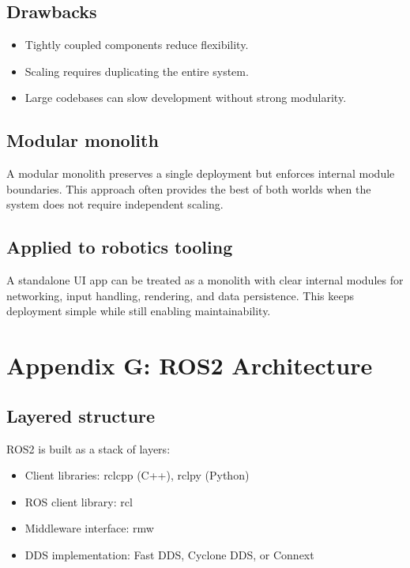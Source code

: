 \documentclass[letterpaper,10pt,english]{sphinxmanual}
\begin{document}
\section{Drawbacks}
\label{\detokenize{appendix_f_monolithic_architecture:drawbacks}}\begin{itemize}
\item {} 
\sphinxAtStartPar
Tightly coupled components reduce flexibility.

\item {} 
\sphinxAtStartPar
Scaling requires duplicating the entire system.

\item {} 
\sphinxAtStartPar
Large codebases can slow development without strong modularity.

\end{itemize}


\section{Modular monolith}
\label{\detokenize{appendix_f_monolithic_architecture:modular-monolith}}
\sphinxAtStartPar
A modular monolith preserves a single deployment but enforces internal module
boundaries. This approach often provides the best of both worlds when the
system does not require independent scaling.


\section{Applied to robotics tooling}
\label{\detokenize{appendix_f_monolithic_architecture:applied-to-robotics-tooling}}
\sphinxAtStartPar
A standalone UI app can be treated as a monolith with clear internal modules
for networking, input handling, rendering, and data persistence. This keeps
deployment simple while still enabling maintainability.


\chapter{Appendix G: ROS2 Architecture}
\label{\detokenize{appendix_g_ros2_architecture:appendix-g-ros2-architecture}}\label{\detokenize{appendix_g_ros2_architecture::doc}}

\section{Layered structure}
\label{\detokenize{appendix_g_ros2_architecture:layered-structure}}
\sphinxAtStartPar
ROS2 is built as a stack of layers:
\begin{itemize}
\item {} 
\sphinxAtStartPar
Client libraries: rclcpp (C++), rclpy (Python)

\item {} 
\sphinxAtStartPar
ROS client library: rcl

\item {} 
\sphinxAtStartPar
Middleware interface: rmw

\item {} 
\sphinxAtStartPar
DDS implementation: Fast DDS, Cyclone DDS, or Connext

\end{itemize}
\end{document}
